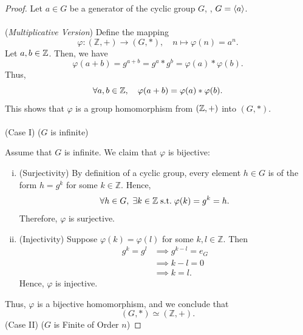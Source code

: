 \documentclass[11pt,openany]{article}
\begin{document}
\newpage
{}
\begin{proof}
	Let \( a \in G \) be a generator of the cyclic group \(G\), \ie, $G=\langle a \rangle$. \\
	\ \\ \noindent
	(\textit{Multiplicative Version})
	Define the mapping \[
	\varphi : (\mathbb{Z}, +) \to (G, \ast),\quad n\mapsto \varphi(n) = a^n.
	\] Let $a,b\in\mathbb{Z}$. Then, we have \[
	\varphi(a+b)=g^{a+b}=g^a\ast g^b = \varphi(a)\ast\varphi(b).
	\] Thus, \[
	\forall a,b\in\mathbb{Z},\quad\varphi(a+b)=\varphi(a)\ast\varphi(b).
	\] This shows that $\varphi$ is a group homomorphism from $(\mathbb{Z},+)$ into $(G,\ast)$.\ \\
	\ \\ \noindent
	(Case I) ($G$ is infinite)
	
	Assume that $G$ is infinite. We claim that $\varphi$ is bijective: \begin{enumerate}[(i)]
		\item (Surjectivity)\; By definition of a cyclic group, every element \(h\in G\) is of the form \(h=g^k\) for some \(k\in \mathbb{Z}\). Hence, \[
		\forall h\in G,\; \exists k\in\mathbb{Z}\; \text{s.t.}\; \varphi(k)=g^k = h.
		\] Therefore, \(\varphi\) is surjective.
		\item (Injectivity)\; Suppose \(\varphi(k)=\varphi(l)\) for some \(k,l\in \mathbb{Z}\). Then \begin{align*}
			g^k=g^l&\implies g^{k-l}=e_G\\
			&\implies k-l=0\\
			&\implies k=l.
		\end{align*}
		Hence, \(\varphi\) is injective.
	\end{enumerate}
	Thus, \(\varphi\) is a bijective homomorphism, and we conclude that
	\[
	(G,\ast) \simeq (\mathbb{Z},+).
	\]
	(Case II)\; (\(G\) is Finite of Order \(n\))


\end{proof}
\end{document}
